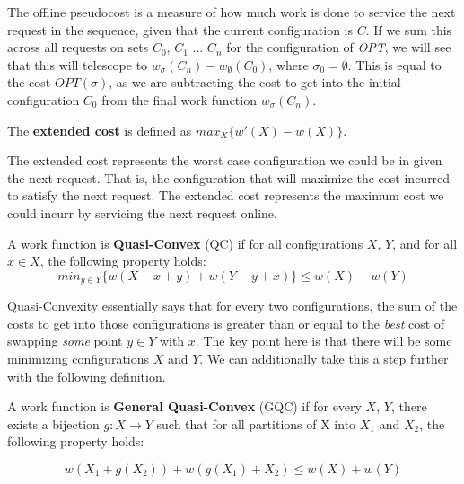 The offline pseudocost is a measure of how much work is done to service the next request in the sequence, given that the current configuration is $C$. If we sum this across all requests on sets $C_0$, $C_1$ ... $C_n$ for the configuration of \textit{OPT}, we will see that this will telescope to $w_{\sigma}(C_n) - w_{\emptyset}(C_0)$, where $\sigma_0 = \emptyset$. This is equal to the cost $OPT(\sigma)$, as we are subtracting the cost to get into the initial configuration $C_0$ from the final work function $w_\sigma(C_n)$.

\begin{definition}
    The \textbf{extended cost} is defined as $max_X \{ w'(X) - w(X)\}$.
\end{definition}

The extended cost represents the worst case configuration we could be in given the next request. That is, the configuration that will maximize the cost incurred to satisfy the next request. The extended cost represents the maximum cost we could incurr by servicing the next request online.

\begin{definition}
    A work function is \textbf{Quasi-Convex} (QC) if for all configurations $X$, $Y$, and for all $x \in X$, the following property holds:
    \begin{equation*}
        min_{y \in Y} \{ w(X - x + y) + w(Y - y + x)\} \leq w(X) + w(Y)
    \end{equation*}
\end{definition}

Quasi-Convexity essentially says that for every two configurations, the sum of the costs to get into those configurations is greater than or equal to the \textit{best} cost of swapping \textit{some} point $y\in Y$ with $x$. The key point here is that there will be some minimizing configurations $X$ and $Y$. We can additionally take this a step further with the following definition.

\begin{definition}
A work function is \textbf{General Quasi-Convex} (GQC) if for every $X$, $Y$, there exists a bijection $g: X \rightarrow Y$ such that for all partitions of X into $X_1$ and $X_2$, the following property holds:

\begin{equation*}
    w(X_1 + g(X_2)) + w(g(X_1) + X_2) \leq w(X) + w(Y)
\end{equation*}
\end{definition}

